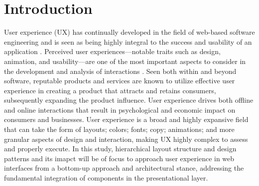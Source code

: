 \documentclass[conference]{IEEEtran}
\begin{document}
\section{Introduction}
User experience (UX) has continually developed in the field of web-based software engineering and is seen as being highly integral to the success and usability of an application \cite{10.1016/j.jvlc.2017.08.004}. Perceived user experiences—notable traits such as design, animation, and usability—are one of the most important aspects to consider in the development and analysis of interactions \cite{benchmarking}. Seen both within and beyond software, reputable products and services are known to utilize effective user experience in creating a product that attracts and retains consumers, subsequently expanding the product influence. User experience drives both offline and online interactions that result in psychological and economic impact on consumers and businesses. User experience is a broad and highly expansive field that can take the form of layouts; colors; fonts; copy; animations; and more granular aspects of design and interaction, making UX highly complex to assess and properly execute. In this study, hierarchical layout structure and design patterns and its imapct will be of focus to approach user experience in web interfaces from a bottom-up approach and architectural stance, addressing the fundamental integration of components in the presentational layer.
\end{document}
